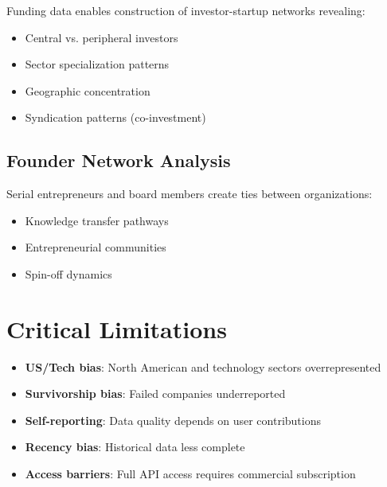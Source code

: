 \documentclass[../main.tex]{subfiles}
\begin{document}
Funding data enables construction of investor-startup networks revealing:
\begin{itemize}[leftmargin=*, itemsep=0.2em]
\item Central vs. peripheral investors
\item Sector specialization patterns
\item Geographic concentration
\item Syndication patterns (co-investment)
\end{itemize}

\subsection*{Founder Network Analysis}

Serial entrepreneurs and board members create ties between organizations:
\begin{itemize}[leftmargin=*, itemsep=0.2em]
\item Knowledge transfer pathways
\item Entrepreneurial communities
\item Spin-off dynamics
\end{itemize}


\section*{Critical Limitations}

\begin{criticalbox}
\begin{itemize}[leftmargin=*, itemsep=0.2em]
\item \textbf{US/Tech bias}: North American and technology sectors overrepresented
\item \textbf{Survivorship bias}: Failed companies underreported
\item \textbf{Self-reporting}: Data quality depends on user contributions
\item \textbf{Recency bias}: Historical data less complete
\item \textbf{Access barriers}: Full API access requires commercial subscription
\end{itemize}
\end{criticalbox}


\end{document}
